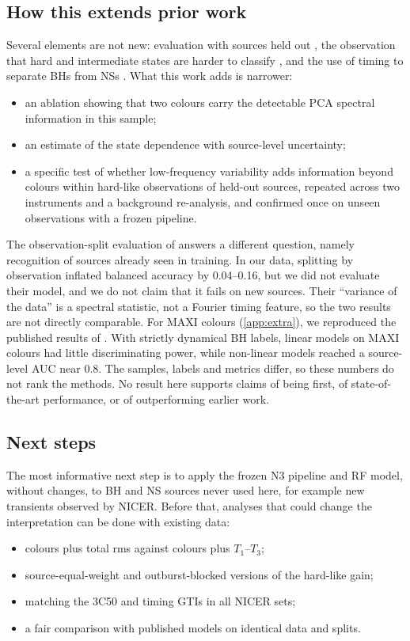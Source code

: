 \documentclass[11pt,a4paper]{article}
\begin{document}
\subsection{How this extends prior work}\label{sec:prior}
Several elements are not new: evaluation with sources held out \citep{Pattnaik2021,deBeurs2022}, the observation that hard
and intermediate states are harder to classify \citep{Pattnaik2021}, and the use of timing to separate BHs from NSs
\citep{SunyaevRevnivtsev2000,WijnandsvanderKlis1999,KleinWolt2008}. What this work adds is narrower:
\begin{itemize}\setlength\itemsep{1pt}
\item an ablation showing that two colours carry the detectable PCA spectral information in this sample;
\item an estimate of the state dependence with source-level uncertainty;
\item a specific test of whether low-frequency variability adds information beyond colours within hard-like
observations of held-out sources, repeated across two instruments and a background re-analysis, and confirmed once on
unseen observations with a frozen pipeline.
\end{itemize}

The observation-split evaluation of \citet{Garg2026} answers a different question, namely recognition of sources already
seen in training. In our data, splitting by observation inflated balanced accuracy by 0.04--0.16, but we did not evaluate
their model, and we do not claim that it fails on new sources. Their ``variance of the data'' is a spectral statistic,
not a Fourier timing feature, so the two results are not directly comparable. For MAXI colours (\cref{app:extra}), we
reproduced the published results of \citet{deBeurs2022}. With strictly dynamical BH labels, linear models on MAXI colours
had little discriminating power, while non-linear models reached a source-level AUC near 0.8. The samples, labels and
metrics differ, so these numbers do not rank the methods. No result here supports claims of being first, of state-of-the-art
performance, or of outperforming earlier work.

\subsection{Next steps}\label{sec:next}
The most informative next step is to apply the frozen N3 pipeline and RF model, without changes, to BH and NS sources
never used here, for example new transients observed by NICER. Before that, analyses that could change the interpretation
can be done with existing data:
\begin{itemize}\setlength\itemsep{1pt}
\item colours plus total rms against colours plus $T_1$--$T_3$;
\item source-equal-weight and outburst-blocked versions of the hard-like gain;
\item matching the 3C50 and timing GTIs in all NICER sets;
\item a fair comparison with published models on identical data and splits.
\end{itemize}
\end{document}
